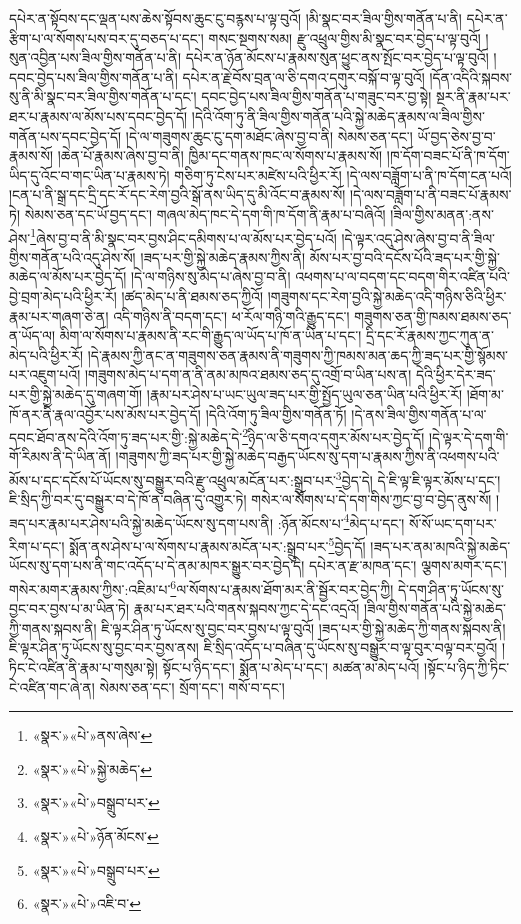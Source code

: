 དཔེར་ན་སྟོབས་དང་ལྡན་པས་ཆེས་སྟོབས་ཆུང་ངུ་བརྙས་པ་ལྟ་བུའོ། །མི་སྣང་བར་ཟིལ་གྱིས་གནོན་པ་ནི། དཔེར་ན་རྩིག་པ་ལ་སོགས་པས་བར་དུ་བཅད་པ་དང་། གསང་སྔགས་སམ། རྫུ་འཕྲུལ་གྱིས་མི་སྣང་བར་བྱེད་པ་ལྟ་བུའོ། །
སུན་འབྱིན་པས་ཟིལ་གྱིས་གནོན་པ་ནི། དཔེར་ན་ཉོན་མོངས་པ་རྣམས་སུན་ཕྱུང་ནས་སྤོང་བར་བྱེད་པ་ལྟ་བུའོ། །དབང་བྱེད་པས་ཟིལ་གྱིས་གནོན་པ་ནི། དཔེར་ན་རྗེ་བོས་བྲན་ལ་ཅི་དགའ་དགུར་བསྐོ་བ་ལྟ་བུའོ། །དོན་འདིའི་སྐབས་སུ་ནི་མི་སྣང་བར་ཟིལ་གྱིས་གནོན་པ་དང་། དབང་བྱེད་པས་ཟིལ་གྱིས་གནོན་པ་གཟུང་བར་བྱ་སྟེ། སྔར་ནི་རྣམ་པར་ཐར་པ་རྣམས་ལ་མོས་པས་དབང་བྱེད་དོ། །དེའི་འོག་ཏུ་ནི་ཟིལ་གྱིས་གནོན་པའི་སྐྱེ་མཆེད་རྣམས་ལ་ཟིལ་གྱིས་གནོན་པས་དབང་བྱེད་དོ། །དེ་ལ་གཟུགས་ཆུང་ངུ་དག་མཐོང་ཞེས་བྱ་བ་ནི། སེམས་ཅན་དང་། ཡོ་བྱད་ཅེས་བྱ་བ་རྣམས་སོ། །ཆེན་པོ་རྣམས་ཞེས་བྱ་བ་ནི། ཁྱིམ་དང་གནས་ཁང་ལ་སོགས་པ་རྣམས་སོ། །ཁ་དོག་བཟང་པོ་ནི་ཁ་དོག་ཡིད་དུ་འོང་བ་གང་ཡིན་པ་རྣམས་ཏེ། གཅིག་ཏུ་ངེས་པར་མཛེས་པའི་ཕྱིར་རོ། །དེ་ལས་བཟློག་པ་ནི་ཁ་དོག་ངན་པའོ། །ངན་པ་ནི་སྒྲ་དང་དྲི་དང་རོ་དང་རེག་བྱའི་སྒོ་ནས་ཡིད་དུ་མི་འོང་བ་རྣམས་སོ། །དེ་ལས་བཟློག་པ་ནི་བཟང་པོ་རྣམས་ཏེ། སེམས་ཅན་དང་ཡོ་བྱད་དང་། གཞལ་མེད་ཁང་དེ་དག་གི་ཁ་དོག་ནི་རྣམ་པ་བཞིའོ། །ཟིལ་གྱིས་མནན་:ནས་ཤེས་\footnote{«སྣར་»«པེ་»ནས་ཞེས་}ཞེས་བྱ་བ་ནི་མི་སྣང་བར་བྱས་ཤིང་དམིགས་པ་ལ་མོས་པར་བྱེད་པའོ། །དེ་ལྟར་འདུ་ཤེས་ཞེས་བྱ་བ་ནི་ཟིལ་གྱིས་གནོན་པའི་འདུ་ཤེས་སོ། །ཟད་པར་གྱི་སྐྱེ་མཆེད་རྣམས་ཀྱིས་ནི། མོས་པར་བྱ་བའི་དངོས་པོའི་ཟད་པར་གྱི་སྐྱེ་མཆེད་ལ་མོས་པར་བྱེད་དོ། །དེ་ལ་གཉིས་སུ་མེད་པ་ཞེས་བྱ་བ་ནི། འཕགས་པ་ལ་བདག་དང་བདག་གིར་འཛིན་པའི་བྱེ་བྲག་མེད་པའི་ཕྱིར་རོ། །ཚད་མེད་པ་ནི་ཐམས་ཅད་ཀྱིའོ། །གཟུགས་དང་རེག་བྱའི་སྐྱེ་མཆེད་འདི་གཉིས་ཅིའི་ཕྱིར་རྣམ་པར་གཞག་ཅེ་ན། འདི་གཉིས་ནི་བདག་དང་། ཕ་རོལ་གཉི་གའི་རྒྱུད་དང་། གཟུགས་ཅན་གྱི་ཁམས་ཐམས་ཅད་ན་ཡོད་ལ། མིག་ལ་སོགས་པ་རྣམས་ནི་རང་གི་རྒྱུད་ལ་ཡོད་པ་ཁོ་ན་ཡིན་པ་དང་། དྲི་དང་རོ་རྣམས་ཀྱང་ཀུན་ན་མེད་པའི་ཕྱིར་རོ། །དེ་རྣམས་ཀྱི་ནང་ན་གཟུགས་ཅན་རྣམས་ནི་གཟུགས་ཀྱི་ཁམས་མན་ཆད་ཀྱི་ཟད་པར་གྱི་སྙོམས་པར་འཇུག་པའོ། །གཟུགས་མེད་པ་དག་ན་ནི་ནམ་མཁའ་ཐམས་ཅད་དུ་འགྲོ་བ་ཡིན་པས་ན། དེའི་ཕྱིར་དེར་ཟད་པར་གྱི་སྐྱེ་མཆེད་དུ་གཞག་གོ། །རྣམ་པར་ཤེས་པ་ཡང་ཡུལ་ཟད་པར་གྱི་སྤྱོད་ཡུལ་ཅན་ཡིན་པའི་ཕྱིར་རོ། །ཐོག་མ་ཁོ་ནར་ནི་རྣལ་འབྱོར་པས་མོས་པར་བྱེད་དོ། །དེའི་འོག་ཏུ་ཟིལ་གྱིས་གནོན་ཏོ། །དེ་ནས་ཟིལ་གྱིས་གནོན་པ་ལ་དབང་ཐོབ་ནས་དེའི་འོག་ཏུ་ཟད་པར་གྱི་:སྐྱེ་མཆེད་དེ་\footnote{«སྣར་»«པེ་»སྐྱེ་མཆེད་}ཉིད་ལ་ཅི་དགའ་དགུར་མོས་པར་བྱེད་དོ། །དེ་ལྟར་དེ་དག་གི་གོ་རིམས་ནི་དེ་ཡིན་ནོ། །གཟུགས་ཀྱི་ཟད་པར་གྱི་སྐྱེ་མཆེད་བརྒྱད་ཡོངས་སུ་དག་པ་རྣམས་ཀྱིས་ནི་འཕགས་པའི་མོས་པ་དང་དངོས་པོ་ཡོངས་སུ་བསྒྱུར་བའི་རྫུ་འཕྲུལ་མངོན་པར་:སྒྲུབ་པར་\footnote{«སྣར་»«པེ་»བསྒྲུབ་པར་}བྱེད་དེ། དེ་ཇི་ལྟ་ཇི་ལྟར་མོས་པ་དང་། ཇི་སྲིད་ཀྱི་བར་དུ་བསྒྱུར་བ་དེ་ཁོ་ན་བཞིན་དུ་འགྱུར་ཏེ། གསེར་ལ་སོགས་པ་དེ་དག་གིས་ཀྱང་བྱ་བ་བྱེད་ནུས་སོ། །ཟད་པར་རྣམ་པར་ཤེས་པའི་སྐྱེ་མཆེད་ཡོངས་སུ་དག་པས་ནི། :ཉོན་མོངས་པ་\footnote{«སྣར་»«པེ་»ཉོན་མོངས་}མེད་པ་དང་། སོ་སོ་ཡང་དག་པར་རིག་པ་དང་། སྨོན་ནས་ཤེས་པ་ལ་སོགས་པ་རྣམས་མངོན་པར་:སྒྲུབ་པར་\footnote{«སྣར་»«པེ་»བསྒྲུབ་པར་}བྱེད་དོ། །ཟད་པར་ནམ་མཁའི་སྐྱེ་མཆེད་ཡོངས་སུ་དག་པས་ནི་གང་འདོད་པ་དེ་ནམ་མཁར་སྒྱུར་བར་བྱེད་དེ། དཔེར་ན་རྫ་མཁན་དང་། ལྕགས་མགར་དང་། གསེར་མགར་རྣམས་ཀྱིས་:འཇིམ་པ་\footnote{«སྣར་»«པེ་»འཇི་བ་}ལ་སོགས་པ་རྣམས་ཐོག་མར་ནི་སྦྱོར་བར་བྱེད་ཀྱི། དེ་དག་ཤིན་ཏུ་ཡོངས་སུ་བྱང་བར་བྱས་པ་མ་ཡིན་ཏེ། རྣམ་པར་ཐར་པའི་གནས་སྐབས་ཀྱང་དེ་དང་འདྲའོ། །ཟིལ་གྱིས་གནོན་པའི་སྐྱེ་མཆེད་ཀྱི་གནས་སྐབས་ནི། ཇི་ལྟར་ཤིན་ཏུ་ཡོངས་སུ་བྱང་བར་བྱས་པ་ལྟ་བུའོ། །ཟད་པར་གྱི་སྐྱེ་མཆེད་ཀྱི་གནས་སྐབས་ནི། ཇི་ལྟར་ཤིན་ཏུ་ཡོངས་སུ་བྱང་བར་བྱས་ནས། ཇི་སྲིད་འདོད་པ་བཞིན་དུ་ཡོངས་སུ་བསྒྱུར་བ་ལྟ་བུར་བལྟ་བར་བྱའོ། །ཏིང་ངེ་འཛིན་ནི་རྣམ་པ་གསུམ་སྟེ། སྟོང་པ་ཉིད་དང་། སྨོན་པ་མེད་པ་དང་། མཚན་མ་མེད་པའོ། །སྟོང་པ་ཉིད་ཀྱི་ཏིང་ངེ་འཛིན་གང་ཞེ་ན། སེམས་ཅན་དང་། སྲོག་དང་། གསོ་བ་དང་། 
